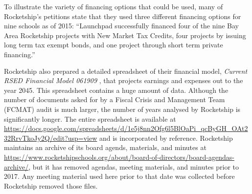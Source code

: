 To illustrate the variety of financing options that could be used, many of Rocketship's petitions state that they used three different financing options for nine schools as of 2015: ``Launchpad successfully financed four of the nine Bay Area Rocketship projects with New Market Tax Credits, four projects by issuing long term tax exempt bonds, and one project through short term private financing.''

Rocketship also prepared a detailed spreadsheet of their financial model, \textit{Current RSED Financial Model 061909} \parencite{RSED2009a}, that projects earnings and expenses out to the year 2045. This spreadsheet contains a huge amount of data. Although the number of documents asked for by a Fiscal Crisis and Management Team (FCMAT) audit is much larger, the number of years analysed by Rocketship is significantly longer. The entire spreadsheet is available at \url{https://docs.google.com/spreadsheets/d/1e5j8nn2Ofg6l5BlOaPi_qcByGH_OAt232RrvTkoJy2Q/edit?usp=view} and is incorporated by reference. Rocketship maintains an archive of its board agends, materials, and minutes at \url{https://www.rocketshipschools.org/about/board-of-directors/board-agendas-archive/}, but it has removed agendas, meeting materials, and minutes prior to 2017. Any meeting material used here prior to that date was collected before Rocketship removed those files.

